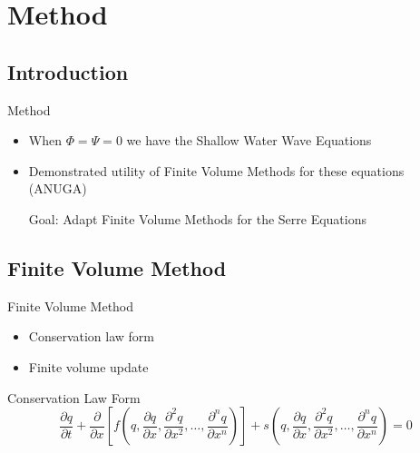 \documentclass[pdf]{beamer}
\begin{document}
\section{Method}
\subsection{Introduction}
\begin{frame}{Method}
	\begin{itemize}
		\item When $\Phi = \Psi =0$ we have the Shallow Water Wave Equations
		\pause
		\item Demonstrated utility of Finite Volume Methods for these equations (ANUGA) \\
		\pause
		\item[Goal:] Adapt Finite Volume Methods for the Serre Equations
	\end{itemize}
\end{frame}

\subsection{Finite Volume Method}
\begin{frame}[label=FVM]{Finite Volume Method}
	\begin{itemize}
		\item Conservation law form
		\pause
		\item Finite volume update 
	\end{itemize}
\end{frame}


\begin{frame}{Conservation Law Form}
	\begin{equation*}
	{\frac{\partial q}{\partial t}} +  {\frac{\partial}{\partial x}} \left[ f\left(q,{\frac{\partial q}{\partial x}}, {\frac{\partial^2 q}{\partial x^2}}, \dots,{\frac{\partial^n q}{\partial x^n}}\right)\right] + s\left(q,{\frac{\partial q}{\partial x}}, {\frac{\partial^2 q}{\partial x^2}}, \dots,{\frac{\partial^n q}{\partial x^n}}\right) = 0
	\end{equation*}
\end{frame}
\end{document}
